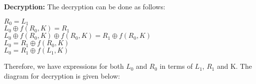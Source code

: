 \documentclass[11pt]{article}
\begin{document}
\textbf{Decryption:} The decryption can be done as follows:
\begin{center}
    $R_0 = L_1$\\
    $L_0 \oplus f(R_0, K) = R_1$ \\
    $L_0 \oplus f(R_0, K) \oplus f(R_0, K) = R_1 \oplus f(R_0, K)$ \\
    $L_0 = R_1 \oplus f(R_0, K)$ \\
    $L_0 = R_1 \oplus f(L_1, K)$
\end{center}
Therefore, we have expressions for both $L_0$ and $R_0$ in terms of $L_1$, $R_1$ and K. The diagram for decryption is given below:
\begin{center}
    \begin{tikzpicture}[x=0.75pt,y=0.75pt,yscale=-1,xscale=1]
     

\end{tikzpicture}
\end{center}
\end{document}
